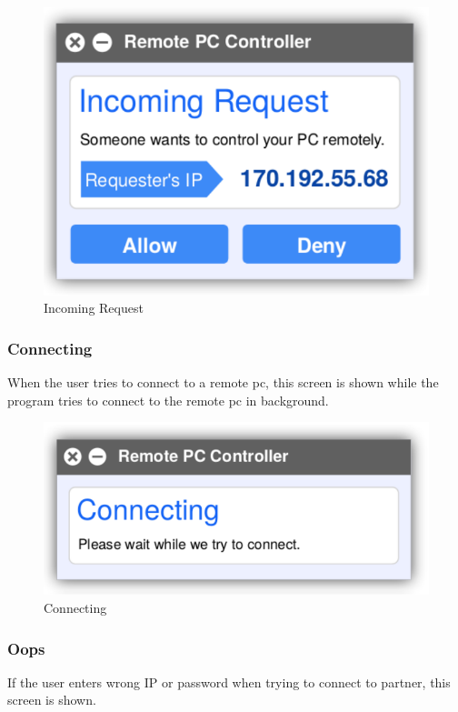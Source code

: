\documentclass[12pt, a4paper]{article}
\begin{document}
\begin{figure}[h!]
\centering
\includegraphics[scale=0.75]{incoming}
\caption{Incoming Request}
\end{figure}

\subsubsection{Connecting}
When the user tries to connect to a remote pc, this screen is shown while the program tries to connect to the remote pc in background.

\begin{figure}[h!]
\centering
\includegraphics[scale=0.75]{connecting}
\caption{Connecting}
\end{figure}

\newpage

\subsubsection{Oops}
If the user enters wrong IP or password when trying to connect to partner, this screen is shown.
\end{document}
